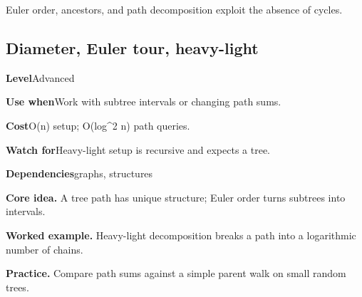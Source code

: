 \documentclass[10pt,letterpaper]{article}
\newcommand{\entrylabel}[1]{\textcolor{accent}{\bfseries #1}}
\begin{document}
\begin{guidebox}Euler order, ancestors, and path decomposition exploit the absence of cycles.\end{guidebox}
\subsection{Diameter, Euler tour, heavy-light}
\begin{guidebox}\small
\entrylabel{Level}\quad Advanced\par
\entrylabel{Use when}\quad Work with subtree intervals or changing path sums.\par
\entrylabel{Cost}\quad O(n) setup; O(log\textasciicircum{}2 n) path queries.\par
\entrylabel{Watch for}\quad Heavy-light setup is recursive and expects a tree.\par
\entrylabel{Dependencies}\quad graphs, structures\par
\end{guidebox}
\noindent\textbf{Core idea.} A tree path has unique structure; Euler order turns subtrees into intervals.\par
\noindent\textbf{Worked example.} Heavy-light decomposition breaks a path into a logarithmic number of chains.\par
\noindent\textbf{Practice.} Compare path sums against a simple parent walk on small random trees.\par
\end{document}
